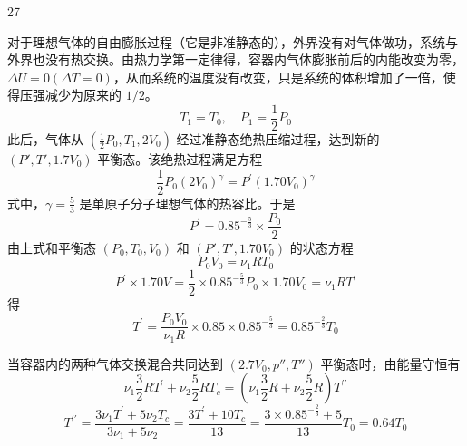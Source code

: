 \begin{solution}{27}
  \begin{subsolution}
    对于理想气体的自由膨胀过程（它是非准静态的），外界没有对气体做功，系统与外界也没有热交换。由热力学第一定律得，容器内气体膨胀前后的内能改变为零，$\Delta U = 0 (\Delta T = 0)$，从而系统的温度没有改变，只是系统的体积增加了一倍，使得压强减少为原来的 $1/2$。
    \begin{equation}
      T_{1} = T_{0}, \quad P_{1} = \frac{1}{2} P_{0}
      \label{eq:1.p27}
    \end{equation}
    此后，气体从 $(\frac{1}{2}P_{0},T_{1},2V_{0})$ 经过准静态绝热压缩过程，达到新的 $(P',T',1.7V_{0})$ 平衡态。该绝热过程满足方程
    \begin{equation}
      \frac{1}{2} P_{0} (2 V_{0})^{\gamma} = P^{\prime} (1.70 V_{0})^{\gamma}
    \end{equation}
    式中，$\gamma = \frac{5}{3}$ 是单原子分子理想气体的热容比。于是
    \begin{equation}
      P^{\prime} = 0.85^{- \frac{5}{3}} \times \frac{P_{0}}{2}
      \label{eq:2.p27}
    \end{equation}
    由上式和平衡态 $(P_{0},T_{0},V_{0})$ 和 $(P',T',1.70V_{0})$ 的状态方程
    \begin{equation}
      P_{0} V_{0} = \nu_{1} R T_{0}
    \end{equation}
    \begin{equation}
      P^{\prime} \times 1.70 V = \frac{1}{2} \times 0.85^{- \frac{5}{3}} P_{0} \times 1.70 V_{0} = \nu_{1} R T^{\prime}
    \end{equation}
    得
    \begin{equation}
      T^{\prime} = \frac{P_{0} V_{0}}{\nu_{1} R} \times 0.85 \times 0.85^{- \frac{5}{3}} = 0.85^{- \frac{2}{3}} T_{0}
      \label{eq:3.p27}
    \end{equation}
  \end{subsolution}
  \begin{subsolution}
    当容器内的两种气体交换混合共同达到 $(2.7V_{0}, p'', T'')$ 平衡态时，由能量守恒有
    \begin{equation}
      \nu_{1} \frac{3}{2} R T^{\prime} + \nu_{2} \frac{5}{2} R T_{c} = (\nu_{1} \frac{3}{2} R + \nu_{2} \frac{5}{2} R) T^{\prime \prime}
    \end{equation}
    \begin{equation}
      T^{\prime \prime} = \frac{3 \nu_{1} T^{\prime} + 5 \nu_{2} T_{c}}{3 \nu_{1} + 5 \nu_{2}} = \frac{3 T^{\prime} + 10 T_{c}}{13} = \frac{3 \times 0.85^{- \frac{2}{3}} + 5}{13} T_{0} = 0.64 T_{0}

\end{equation}
\end{subsolution}
\end{solution}
